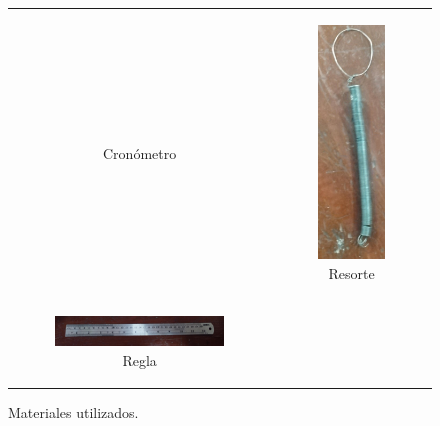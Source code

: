 \documentclass[../main.tex]{subfiles}
\begin{document}
\begin{figure}[H]
\begin{tabular}{c c}
\begin{subfigure}{0.5\textwidth}
        \caption{Cronómetro}
        \label{fig:mat3}
    \end{subfigure}
    &
    \begin{subfigure}{0.5\textwidth} 
        \centering
        \includegraphics[width=0.8\linewidth,height=0.6\linewidth]{resources/mat4.jpg}
        \caption{Resorte}
        \label{fig:mat4}
    \end{subfigure}
    \\       
    \begin{subfigure}{0.5\textwidth} 
        \centering
        \includegraphics[width=0.8\linewidth,height=0.6\linewidth]{resources/mat5.jpg}
        \caption{Regla}
        \label{fig:mat5}
    \end{subfigure}
    \\
\end{tabular}
\caption{Materiales utilizados.}
\label{fig:}
\end{figure}
\end{document}
